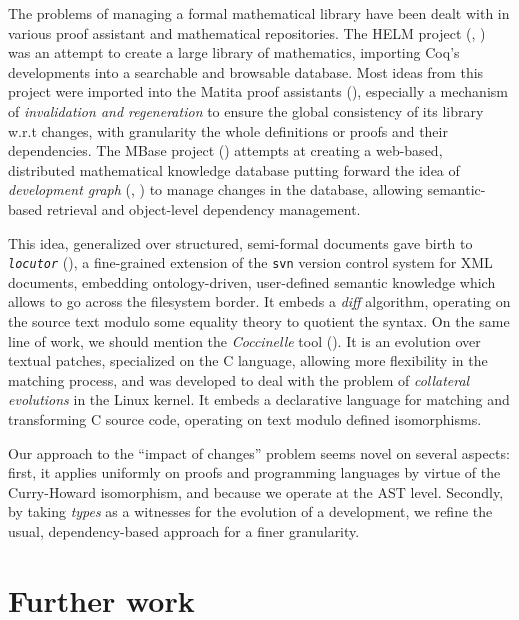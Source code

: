 \documentclass{article}
\begin{document}
The problems of managing a formal mathematical library have been dealt
with in various proof assistant and mathematical repositories. The
HELM project (\cite{asperti2000content}, \cite{asperti2006content})
was an attempt to create a large library of mathematics, importing
\textsf{Coq}'s developments into a searchable and browsable database.
Most ideas from this project were imported into the \textsf{Matita}
proof assistants (\cite{asperti2007hop}), especially a mechanism of
\emph{invalidation and regeneration} to ensure the global consistency
of its library w.r.t changes, with granularity the whole definitions
or proofs and their dependencies. The MBase project
(\cite{kohlhase2001mbase}) attempts at creating a web-based,
distributed mathematical knowledge database putting forward the idea
of \emph{development graph} (\cite{hutter2000management},
\cite{autexier2000towards}) to manage changes in the database,
allowing semantic-based retrieval and object-level dependency
management.

This idea, generalized over structured, semi-formal documents gave
birth to \texttt{\it locutor} (\cite{muller2008fine}), a fine-grained
extension of the \texttt{svn} version control system for XML
documents, embedding ontology-driven, user-defined semantic knowledge
which allows to go across the filesystem border. It embeds a
\emph{diff} algorithm, operating on the source text modulo some
equality theory to quotient the syntax. On the same line of work, we
should mention the \emph{Coccinelle} tool
(\cite{padioleau2008documenting}). It is an evolution over textual
patches, specialized on the C language, allowing more flexibility in
the matching process, and was developed to deal with the problem of
\emph{collateral evolutions} in the Linux kernel. It embeds a
declarative language for matching and transforming C source code,
operating on text modulo defined isomorphisms.

Our approach to the ``impact of changes'' problem seems novel on
several aspects: first, it applies uniformly on proofs and programming
languages by virtue of the Curry-Howard isomorphism, and because we
operate at the AST level. Secondly, by taking \emph{types} as a
witnesses for the evolution of a development, we refine the usual,
dependency-based approach for a finer granularity.

\section{Further work}
\label{fw}
\end{document}
